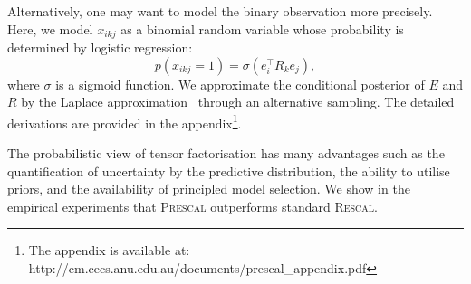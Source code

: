 Alternatively, one may want to model the binary observation more precisely.
Here, we model $x_{ikj}$ as a binomial random variable whose
probability is determined by logistic regression:
\[
p(x_{ikj}=1) = \sigma(e_i^{\top} R_k e_j),
\]
where $\sigma$ is a sigmoid function.
We approximate the conditional posterior of
$E$ and $R$ by the Laplace approximation~\cite{bishop2006pattern} through an alternative sampling. The detailed derivations are provided in the appendix\footnote{The appendix is available at: http://cm.cecs.anu.edu.au/documents/prescal\_appendix.pdf}.

The probabilistic view of tensor factorisation has many advantages such as
the quantification of uncertainty by the predictive distribution,
the ability to utilise priors, and
the availability of principled model selection.
We show in the empirical experiments that \textsc{Prescal} outperforms standard \textsc{Rescal}.
